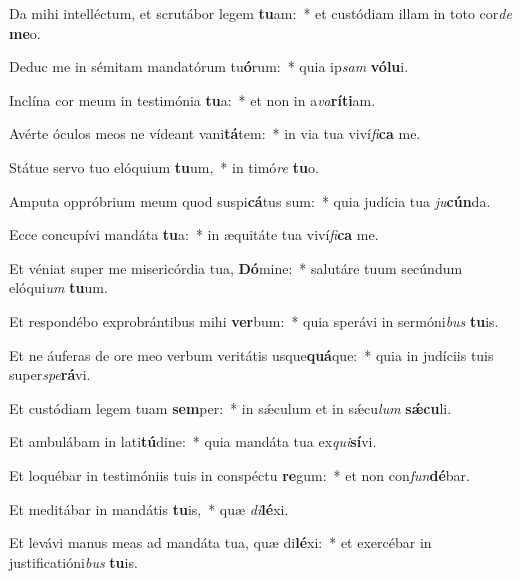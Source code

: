 \item Da mihi intelléctum, et scrutábor legem \textbf{tu}am:~* et custódiam illam in toto cor\textit{de} \textbf{me}o.
\item Deduc me in sémitam mandatórum tu\textbf{ó}rum:~* quia ip\textit{sam} \textbf{vó}\textbf{lu}i.
\item Inclína cor meum in testimónia \textbf{tu}a:~* et non in a\textit{va}\textbf{rí}\textbf{ti}am.
\item Avérte óculos meos ne vídeant vani\textbf{tá}tem:~* in via tua viví\textit{fi}\textbf{ca} me.
\item Státue servo tuo elóquium \textbf{tu}um,~* in timó\textit{re} \textbf{tu}o.
\item Amputa oppróbrium meum quod suspi\textbf{cá}tus sum:~* quia judícia tua \textit{ju}\textbf{cún}da.
\item Ecce concupívi mandáta \textbf{tu}a:~* in æquitáte tua viví\textit{fi}\textbf{ca} me.
\item Et véniat super me misericórdia tua, \textbf{Dó}mine:~* salutáre tuum secúndum elóqui\textit{um} \textbf{tu}um.
\item Et respondébo exprobrántibus mihi \textbf{ver}bum:~* quia sperávi in sermóni\textit{bus} \textbf{tu}is.
\item Et ne áuferas de ore meo verbum veritátis usque\textbf{quá}que:~* quia in judíciis tuis super\textit{spe}\textbf{rá}vi.
\item Et custódiam legem tuam \textbf{sem}per:~* in sǽculum et in sǽcu\textit{lum} \textbf{sǽ}\textbf{cu}li.
\item Et ambulábam in lati\textbf{tú}dine:~* quia mandáta tua ex\textit{qui}\textbf{sí}vi.
\item Et loquébar in testimóniis tuis in conspéctu \textbf{re}gum:~* et non con\textit{fun}\textbf{dé}bar.
\item Et meditábar in mandátis \textbf{tu}is,~* quæ \textit{di}\textbf{lé}xi.
\item Et levávi manus meas ad mandáta tua, quæ di\textbf{lé}xi:~* et exercébar in justificatióni\textit{bus} \textbf{tu}is.
